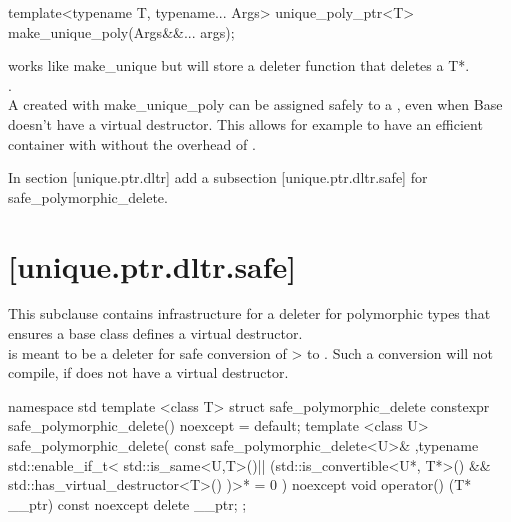 \documentclass[ebook,11pt,article]{memoir}
\begin{document}
\begin{itemdecl}
template<typename T, typename... Args>
unique_poly_ptr<T> make_unique_poly(Args&&... args);

\end{itemdecl}

\pnum
\effects works like make_unique but will store a deleter function that deletes a T*.
\\
\pnum
\returns {}.
\\

\pnum
\enternote
A  created with make_unique_poly can be assigned safely to a , even when Base doesn't have a virtual destructor. This allows for example to have an efficient container with  without the overhead of .
\exitnote


In section [unique.ptr.dltr] add a subsection [unique.ptr.dltr.safe] for safe_polymorphic_delete.
\\

\section{ [unique.ptr.dltr.safe]}
\pnum
This subclause contains infrastructure for a deleter for polymorphic types that ensures a base class defines a virtual destructor.\\

\pnum
\enternote
{} is meant to be a deleter for safe conversion of > to . Such a conversion will not compile, if  does not have a virtual destructor.
\exitnote

\begin{codeblock}
namespace std{
template <class T>
struct  safe_polymorphic_delete {
    constexpr safe_polymorphic_delete() noexcept = default;
    template <class U>
         safe_polymorphic_delete(
              const safe_polymorphic_delete<U>&
             ,typename std::enable_if_t<
             	 std::is_same<U,T>{}()||
             	 (std::is_convertible<U*, T*>{}()
             	  &&  std::has_virtual_destructor<T>{}()
            	  )>* = 0
          ) noexcept {}
     void operator() (T* __ptr) const noexcept
     { delete __ptr; }
};
}
\end{codeblock}
\end{document}
